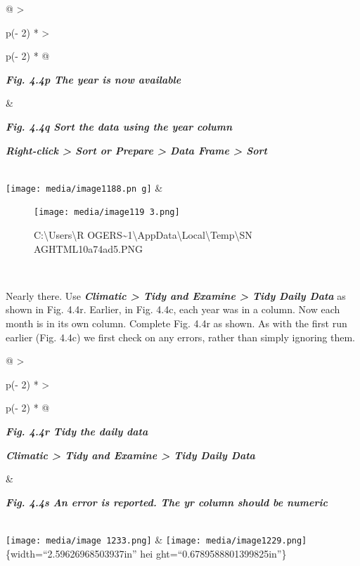 \documentclass[
  letterpaper,
  DIV=11,
  numbers=noendperiod]{scrreprt}
\begin{document}
\begin{longtable}[]{@{}
  >{\raggedright\arraybackslash}p{(\columnwidth - 2\tabcolsep) * }
  >{\raggedright\arraybackslash}p{(\columnwidth - 2\tabcolsep) * }@{}}
\toprule\noalign{}
\begin{minipage}[b]{\linewidth}\raggedright
\textbf{\emph{Fig. 4.4p The year is now available}}
\end{minipage} & \begin{minipage}[b]{\linewidth}\raggedright
\textbf{\emph{Fig. 4.4q Sort the data using the year column}}

\textbf{\emph{Right-click \textgreater{} Sort or Prepare \textgreater{}
Data Frame \textgreater{} Sort}}
\end{minipage} \\
\midrule\noalign{}
\endhead
\bottomrule\noalign{}
\endlastfoot
\texttt{[image: media/image1188.pn g]}
& \begin{minipage}[t]{\linewidth}\raggedright
\begin{figure}[H]

{\centering \texttt{[image: media/image119 3.png]}

}

\caption{C:\textbackslash Users\textbackslash R
OGERS\textasciitilde1\textbackslash AppData\textbackslash Local\textbackslash Temp\textbackslash SN
AGHTML10a74ad5.PNG}

\end{figure}%
\end{minipage} \\
\end{longtable}

Nearly there. Use \textbf{\emph{Climatic \textgreater{} Tidy and Examine
\textgreater{} Tidy Daily Data}} as shown in Fig. 4.4r. Earlier, in Fig.
4.4c, each year was in a column. Now each month is in its own column.
Complete Fig. 4.4r as shown. As with the first run earlier (Fig. 4.4c)
we first check on any errors, rather than simply ignoring them.

\begin{longtable}[]{@{}
  >{\raggedright\arraybackslash}p{(\columnwidth - 2\tabcolsep) * }
  >{\raggedright\arraybackslash}p{(\columnwidth - 2\tabcolsep) * }@{}}
\toprule\noalign{}
\begin{minipage}[b]{\linewidth}\raggedright
\textbf{\emph{Fig. 4.4r Tidy the daily data}}

\textbf{\emph{Climatic \textgreater{} Tidy and Examine \textgreater{}
Tidy Daily Data}}
\end{minipage} & \begin{minipage}[b]{\linewidth}\raggedright
\textbf{\emph{Fig. 4.4s An error is reported. The yr column should be
numeric}}
\end{minipage} \\
\midrule\noalign{}
\endhead
\bottomrule\noalign{}
\endlastfoot
\texttt{[image: media/image 1233.png]} &
\texttt{[image: media/image1229.png]} \{width=``2.59626968503937in'' hei
ght=``0.6789588801399825in''\} \\
\end{longtable}
\end{document}
